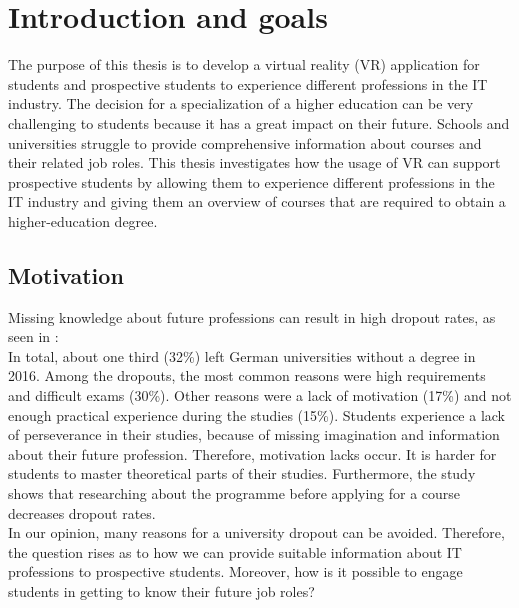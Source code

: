 \chapter{Introduction and goals}
The purpose of this thesis is to develop a virtual reality (VR) application for students and prospective students to experience different professions in the IT industry. 
The decision for a specialization of a higher education can be very challenging to students because it has a great impact on their future. Schools and universities struggle to provide comprehensive information about courses and their related job roles. This thesis investigates how the usage of VR can support prospective students by allowing them to experience different professions in the IT industry and giving them an overview of courses that are required to obtain a higher-education degree.



\section{Motivation}
Missing knowledge about future professions can result in high dropout rates, as seen in \cite{UlrichHeublein.Juni2017}: \\ In total, about one third (32\%) left German universities without a degree in 2016. Among the dropouts, the most common reasons were high requirements and difficult exams (30\%). Other reasons were a lack of motivation (17\%) and not enough practical experience during the studies (15\%).
Students  experience a lack of perseverance in their studies, because of missing imagination and information about their future profession. Therefore, motivation lacks occur. It is harder for students to master theoretical parts of their studies. Furthermore, the study shows that researching about the programme before applying for a course decreases dropout rates. \\
In our opinion, many reasons for a university dropout can be avoided. Therefore, the question rises as to how we can provide suitable information about IT professions to prospective students. Moreover, how is it possible to engage students in getting to know their future job roles?

